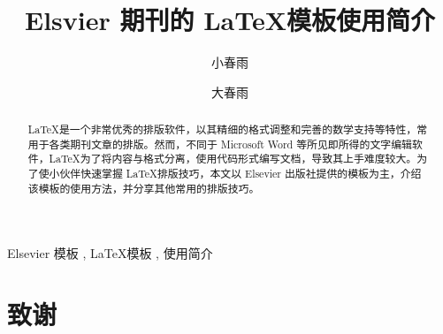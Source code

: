 \documentclass[preprint,3p,onecolumn]{elsarticle}
\begin{document}
    \begin{frontmatter}
        \title{Elsvier 期刊的 \LaTeX 模板使用简介}

        \author[1]{小春雨}
        \author[2]{大春雨 }

        \address[1]{手动使用逗号或句号分割的，完整的，可自定义内容的地址}


        \begin{abstract}
            \LaTeX 是一个非常优秀的排版软件，以其精细的格式调整和完善的数学支持等特性，常用于各类期刊文章的排版。然而，不同于 Microsoft Word 等所见即所得的文字编辑软件，\LaTeX 为了将内容与格式分离，使用代码形式编写文档，导致其上手难度较大。为了使小伙伴快速掌握 \LaTeX 排版技巧，本文以 Elsevier 出版社提供的模板为主，介绍该模板的使用方法，并分享其他常用的排版技巧。
        \end{abstract}

        \begin{keyword}
            Elsevier 模板 \sep 
            \LaTeX 模板 \sep
            使用简介
        \end{keyword}
    \end{frontmatter}

    

    \section*{致谢}
    

    
\end{document}
